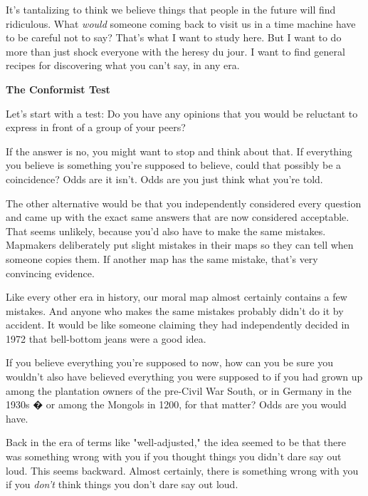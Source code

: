 It's tantalizing to think we believe things
                  that people in the future will find ridiculous. What
                  \emph{would} someone coming back to visit us in a time machine
                  have to be careful not to say? That's what I want to study
                  here. But I want to do more than just shock everyone with the
                  heresy du jour. I want to find general recipes for discovering
                  what you can't say, in any era.

\textbf{The Conformist Test}

Let's start with a test: Do you have any opinions
                  that you would be reluctant to express in front of a group of
                  your peers?

If the answer is no, you might want to
                  stop and think about that. If everything you believe is
                  something you're supposed to believe, could that possibly be a
                  coincidence? Odds are it isn't. Odds are you just think what
                  you're told.

The other alternative would be that
                  you independently considered every question and came up with
                  the exact same answers that are now considered acceptable.
                  That seems unlikely, because you'd also have to make the same
                  mistakes. Mapmakers deliberately put slight mistakes in their
                  maps so they can tell when someone copies them. If another map
                  has the same mistake, that's very convincing evidence.

Like
                  every other era in history, our moral map almost certainly
                  contains a few mistakes. And anyone who makes the same
                  mistakes probably didn't do it by accident. It would be like
                  someone claiming they had independently decided in 1972 that
                  bell-bottom jeans were a good idea.

If you believe
                  everything you're supposed to now, how can you be sure you
                  wouldn't also have believed everything you were supposed to if
                  you had grown up among the plantation owners of the pre-Civil
                  War South, or in Germany in the 1930s � or among the Mongols
                  in 1200, for that matter? Odds are you would have.

Back
                  in the era of terms like "well-adjusted," the idea seemed to
                  be that there was something wrong with you if you thought
                  things you didn't dare say out loud. This seems backward.
                  Almost certainly, there is something wrong with you if you
                  \emph{don't} think things you don't dare say out loud.

